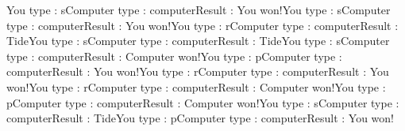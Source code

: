 
You type : sComputer type : {computer}Result : You won!You type : sComputer type : {computer}Result : You won!You type : rComputer type : {computer}Result : TideYou type : sComputer type : {computer}Result : TideYou type : sComputer type : {computer}Result : Computer won!You type : pComputer type : {computer}Result : You won!You type : rComputer type : {computer}Result : You won!You type : rComputer type : {computer}Result : Computer won!You type : pComputer type : {computer}Result : Computer won!You type : sComputer type : {computer}Result : TideYou type : pComputer type : {computer}Result : You won!